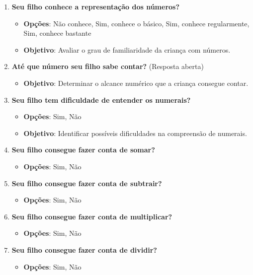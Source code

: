 \begin{enumerate}
    \item \textbf{Seu filho conhece a representação dos números?}
    \begin{itemize}
        \item \textbf{Opções}: Não conhece, Sim, conhece o básico, Sim, conhece regularmente, Sim, conhece bastante
        \item \textbf{Objetivo}: Avaliar o grau de familiaridade da criança com números.
    \end{itemize}

    \item \textbf{Até que número seu filho sabe contar?} (Resposta aberta)
    \begin{itemize}
        \item \textbf{Objetivo}: Determinar o alcance numérico que a criança consegue contar.
    \end{itemize}

    \item \textbf{Seu filho tem dificuldade de entender os numerais?}
    \begin{itemize}
        \item \textbf{Opções}: Sim, Não
        \item \textbf{Objetivo}: Identificar possíveis dificuldades na compreensão de numerais.
    \end{itemize}

    \item \textbf{Seu filho consegue fazer conta de somar?}
    \begin{itemize}
        \item \textbf{Opções}: Sim, Não
    \end{itemize}

    \item \textbf{Seu filho consegue fazer conta de subtrair?}
    \begin{itemize}
        \item \textbf{Opções}: Sim, Não
    \end{itemize}

    \item \textbf{Seu filho consegue fazer conta de multiplicar?}
    \begin{itemize}
        \item \textbf{Opções}: Sim, Não
    \end{itemize}

    \item \textbf{Seu filho consegue fazer conta de dividir?}
    \begin{itemize}
        \item \textbf{Opções}: Sim, Não
    \end{itemize}


\end{enumerate}
